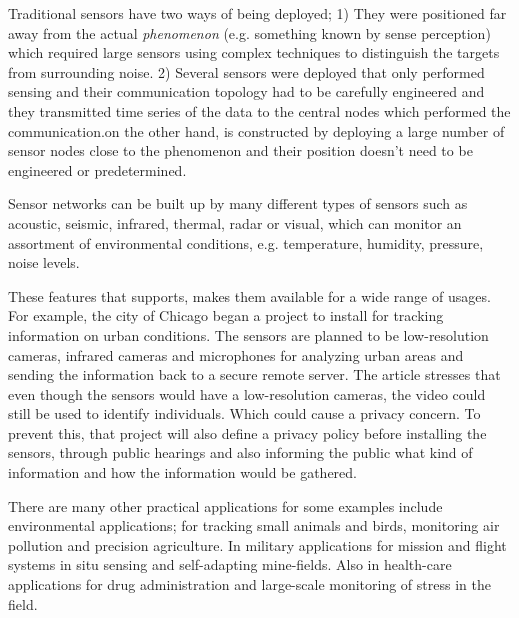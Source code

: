Traditional sensors have two ways of being deployed; 1) They were positioned far away from the actual \textit{phenomenon} (e.g. something known by sense perception) which required large sensors using complex techniques to distinguish the targets from surrounding noise. 2) Several sensors were deployed that only performed sensing and their communication topology had to be carefully engineered and they transmitted time series of the data to the central nodes which performed the communication.\wsns on the other hand, is constructed by deploying a large number of sensor nodes close to the phenomenon and their position doesn't need to be engineered or predetermined\cite{wsnsurvey}. 


Sensor networks can be built up by many different types of sensors such as acoustic, seismic, infrared, thermal, radar or visual, which can monitor an assortment of environmental conditions\cite{estrin1999next}, e.g. temperature, humidity, pressure, noise levels. 

These features that \wsns supports, makes them available for a wide range of usages. For example, the city of Chicago began a project\cite{chicago2016} to install \wsn for tracking information on urban conditions. The sensors are planned to be low-resolution cameras, infrared cameras and microphones for analyzing urban areas and sending the information back to a secure remote server. The article stresses that even though the sensors would have a low-resolution cameras, the video could still be used to identify individuals. Which could cause a privacy concern. To prevent this, that project will also define a privacy policy before installing the sensors, through public hearings and also informing the public what kind of information and how the information would be gathered.

There are many other practical applications for \wsns some examples include environmental applications; for tracking small animals and birds, monitoring air pollution and precision agriculture\cite{baggio2005wireless,collier2010acoustic, khedo2010wireless}. In military applications for mission and flight systems in situ sensing and self-adapting mine-fields\cite{vardhan2000wireless, merrill2003collaborative}. Also in health-care applications for drug administration and large-scale monitoring of stress in the field\cite{darwish2011wearable, ertin2011autosense}.


